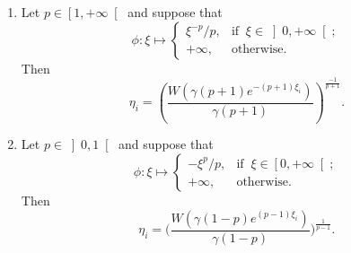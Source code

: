 \documentclass[a4paper,11pt,fleqn]{article}
\newcommand{\RP}{\ensuremath{\left[0,+\infty\right[}}
\newcommand{\RPP}{\ensuremath{\left]0,+\infty\right[}}
\theoremstyle{plain}{\theorembodyfont{\rmfamily}%
\newtheorem{conjecture}[theorem]{Conjecture}}
\theoremstyle{plain}{\theorembodyfont{\rmfamily}%
\newtheorem{example}[theorem]{Example}}
\theoremstyle{plain}{\theorembodyfont{\rmfamily}%
\newtheorem{remark}[theorem]{Remark}}
\theoremstyle{plain}{\theorembodyfont{\rmfamily}%
\newtheorem{algorithm}[theorem]{Algorithm}}
\theoremstyle{plain}{\theorembodyfont{\rmfamily}%
\newtheorem{condition}[theorem]{Condition}}
\theoremstyle{plain}{\theorembodyfont{\rmfamily}%
\newtheorem{definition}[theorem]{Definition}}
\theoremstyle{plain}{\theorembodyfont{\rmfamily}
\newtheorem{problem}[theorem]{Problem}}
\theoremstyle{plain}{\theorembodyfont{\rmfamily}
\newtheorem{notation}[theorem]{Notation}}
\numberwithin{equation}{section}
\begin{document}
\begin{example}
\begin{enumerate}
\begin{equation}
\begin{cases}
\left(\dfrac{W(\gamma(p-1)e^{(p-1)\xi_i})}{\gamma(p-1)}
\right)^{\frac{1}{p-1}},&\text{if}\;\;p>1;\\[4mm]
e^{\xi_i-\gamma},&\text{if}\;\;p=1.
\end{cases}
\end{equation}
\item
\label{IVex:1v}
Let $p\in\left[1,+\infty\right[$ and suppose that
\begin{equation}
\phi\colon\xi\mapsto
\begin{cases}
\xi^{-p}/p,&\text{if}\;\;\xi\in\RPP;\\
+\infty,&\text{otherwise}.
\end{cases}
\end{equation}
Then 
\begin{equation}
\eta_i=\left(\frac{W(\gamma(p+1)e^{-(p+1)\xi_i})}{\gamma(p+1)}
\right)^{\frac{-1}{p+1}}.
\end{equation}
\item
\label{IVex:1vi}
Let $p\in\left]0,1\right[$ and suppose that
\begin{equation}
\phi\colon\xi\mapsto
\begin{cases}
-\xi^p/p,&\text{if}\;\;\xi\in\RP;\\
+\infty,&\text{otherwise}.
\end{cases}
\end{equation} 
Then 
\begin{equation}
\eta_i=\Bigg(\frac{W(\gamma(1-p)e^{(p-1)\xi_i})}{\gamma(1-p)}
\Bigg)^{\frac{1}{p-1}}.
\end{equation}
\end{enumerate}
\end{example}
\end{document}
